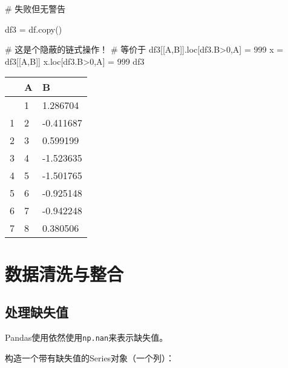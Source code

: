 \documentclass[
  letterpaper,
  DIV=11,
  numbers=noendperiod]{scrreprt}
\newenvironment{Shaded}{\begin{snugshade}}{\end{snugshade}}
\newcommand{\CommentTok}[1]{\textcolor[rgb]{0.37,0.37,0.37}{#1}}
\newcommand{\DecValTok}[1]{\textcolor[rgb]{0.68,0.00,0.00}{#1}}
\newcommand{\NormalTok}[1]{\textcolor[rgb]{0.00,0.23,0.31}{#1}}
\newcommand{\OperatorTok}[1]{\textcolor[rgb]{0.37,0.37,0.37}{#1}}
\newcommand{\StringTok}[1]{\textcolor[rgb]{0.13,0.47,0.30}{#1}}
\begin{document}
\begin{Shaded}
\begin{Highlighting}[]
\CommentTok{\# 失败但无警告}

\NormalTok{df3 }\OperatorTok{=}\NormalTok{ df.copy()}

\CommentTok{\# 这是个隐蔽的链式操作！}
\CommentTok{\# 等价于 df3[[\textquotesingle{}A\textquotesingle{},\textquotesingle{}B\textquotesingle{}]].loc[df3.B\textgreater{}0,\textquotesingle{}A\textquotesingle{}] = 999}
\NormalTok{x }\OperatorTok{=}\NormalTok{ df3[[}\StringTok{\textquotesingle{}A\textquotesingle{}}\NormalTok{,}\StringTok{\textquotesingle{}B\textquotesingle{}}\NormalTok{]]}
\NormalTok{x.loc[df3.B}\OperatorTok{\textgreater{}}\DecValTok{0}\NormalTok{,}\StringTok{\textquotesingle{}A\textquotesingle{}}\NormalTok{] }\OperatorTok{=} \DecValTok{999}
\NormalTok{df3}
\end{Highlighting}
\end{Shaded}

\begin{longtable}[]{@{}lll@{}}
\toprule\noalign{}
& A & B \\
\midrule\noalign{}
\endhead
\bottomrule\noalign{}
\endlastfoot
0 & 1 & 1.286704 \\
1 & 2 & -0.411687 \\
2 & 3 & 0.599199 \\
3 & 4 & -1.523635 \\
4 & 5 & -1.501765 \\
5 & 6 & -0.925148 \\
6 & 7 & -0.942248 \\
7 & 8 & 0.380506 \\
\end{longtable}

\hypertarget{ux6570ux636eux6e05ux6d17ux4e0eux6574ux5408}{%
\section{数据清洗与整合}\label{ux6570ux636eux6e05ux6d17ux4e0eux6574ux5408}}

\hypertarget{ux5904ux7406ux7f3aux5931ux503c}{%
\subsection{处理缺失值}\label{ux5904ux7406ux7f3aux5931ux503c}}

Pandas使用依然使用\texttt{np.nan}来表示缺失值。

构造一个带有缺失值的Series对象（一个列）：
\end{document}
